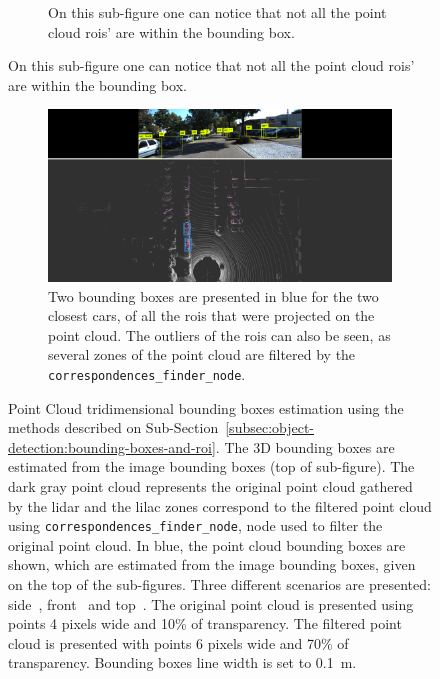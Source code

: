 \begin{figure}[H]
\begin{subfigure}[c]{0.8\textwidth}
		\caption{On this sub-figure one can notice that not all the point cloud \acp{roi}' are within the bounding box.}
		\label{fig:bboxes-3d-kitti-front}
	\end{subfigure}
\end{figure}
\begin{figure}[!ht]\ContinuedFloat
	\centering
	\begin{subfigure}[c]{0.8\textwidth}
		\centering
		\includegraphics[width=\textwidth]{img/image-object-to-point-cloud/bboxes-top-view.png}
		\caption{Two bounding boxes are presented in blue for the two closest cars, of all the \acp{roi} that were projected on the point cloud. The outliers of the \acp{roi} can also be seen, as several zones of the point cloud are filtered by the \texttt{correspondences\_finder\_node}.}
		\label{fig:bboxes-3d-kitti-top}
	\end{subfigure}
	\caption[Comparison between the estimated tridimensional bounding boxes' dimensions and position and the point cloud data, object clusters and \acs{roi}.]{Point Cloud tridimensional bounding boxes estimation using the methods described on Sub-Section~\ref{subsec:object-detection:bounding-boxes-and-roi}. The 3D bounding boxes are estimated from the image bounding boxes (top of sub-figure). The dark gray point cloud represents the original point cloud gathered by the \ac{lidar} and the lilac zones correspond to the filtered point cloud using \texttt{correspondences\_finder\_node}, node used to filter the original point cloud. In blue, the point cloud bounding boxes are shown, which are estimated from the image bounding boxes, given on the top of the sub-figures. Three different scenarios are presented: side~, front~ and top~. The original point cloud is presented using points 4 pixels wide and 10\% of transparency. The filtered point cloud is presented with points 6 pixels wide and 70\% of transparency. Bounding boxes line width is set to \SI{0.1}{\meter}.} 
	\label{fig:bboxes-3d-kitti}
\end{figure}


